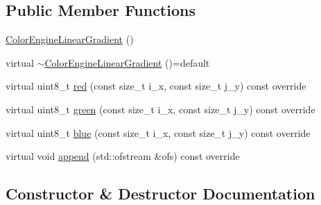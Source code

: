 \subsection*{Public Member Functions}
\begin{DoxyCompactItemize}
\item 
\hyperlink{classGraphicalEditorCore_1_1ColorEngineLinearGradient_a12f2a422a82b8376d0ddaca148e82e86}{Color\+Engine\+Linear\+Gradient} ()
\item 
virtual \hyperlink{classGraphicalEditorCore_1_1ColorEngineLinearGradient_acb6ceca52590a6c0f06dbe88e8372ee7}{$\sim$\+Color\+Engine\+Linear\+Gradient} ()=default
\item 
virtual uint8\+\_\+t \hyperlink{classGraphicalEditorCore_1_1ColorEngineLinearGradient_acecdc769c65b3ede786edd1a6abe72b5}{red} (const size\+\_\+t i\+\_\+x, const size\+\_\+t j\+\_\+y) const override
\item 
virtual uint8\+\_\+t \hyperlink{classGraphicalEditorCore_1_1ColorEngineLinearGradient_a961e4df71e25e227418a7bcb13c7379b}{green} (const size\+\_\+t i\+\_\+x, const size\+\_\+t j\+\_\+y) const override
\item 
virtual uint8\+\_\+t \hyperlink{classGraphicalEditorCore_1_1ColorEngineLinearGradient_a4a7f4918aa7444b6816c24c42611b157}{blue} (const size\+\_\+t i\+\_\+x, const size\+\_\+t j\+\_\+y) const override
\item 
virtual void \hyperlink{classGraphicalEditorCore_1_1ColorEngineLinearGradient_a59b48ec1f15564348c833150ddfe2eea}{append} (std\+::ofstream \&ofs) const override
\end{DoxyCompactItemize}


\subsection{Constructor \& Destructor Documentation}

